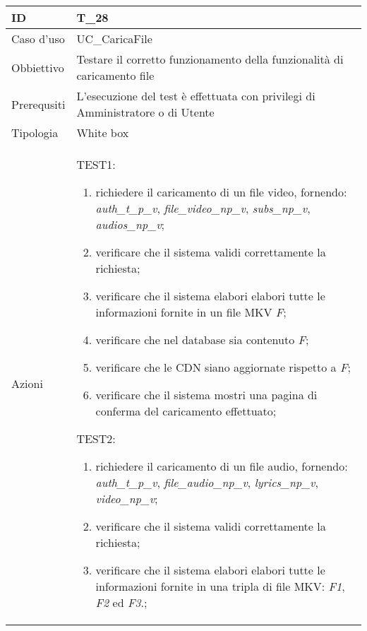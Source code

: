 \begin{table}[hb]
    \centering
    \begin{tabular}{ |p{2cm}|p{10cm}|  }
        \hline
        ID          & T\_28                                                                          \\\hline
        Caso d'uso  & UC\_CaricaFile                                                                 \\\hline
        Obbiettivo  & Testare il corretto funzionamento della funzionalità di caricamento file       \\\hline
        Prerequsiti & L'esecuzione del test è effettuata con privilegi di Amministratore o di Utente \\\hline
        Tipologia   & White box                                                                      \\\hline
        Azioni      &
        TEST1:
        \begin{enumerate}[nosep, topsep=0pt]
            \item richiedere il caricamento di un file video, fornendo: \emph{auth\_t\_p\_v}, \emph{file\_video\_np\_v}, \emph{subs\_np\_v}, \emph{audios\_np\_v};
            \item verificare che il sistema validi correttamente la richiesta;
            \item verificare che il sistema elabori elabori tutte le informazioni fornite in un file MKV \emph{F};
            \item verificare che nel database sia contenuto \emph{F};
            \item verificare che le CDN siano aggiornate rispetto a \emph{F};
            \item verificare che il sistema mostri una pagina di conferma del caricamento effettuato;
        \end{enumerate}
        \vspace{0.5cm} TEST2:
        \begin{enumerate}[nosep, topsep=0pt]
            \item richiedere il caricamento di un file audio, fornendo: \emph{auth\_t\_p\_v}, \emph{file\_audio\_np\_v}, \emph{lyrics\_np\_v}, \emph{video\_np\_v};
            \item verificare che il sistema validi correttamente la richiesta;
            \item verificare che il sistema elabori elabori tutte le informazioni fornite in una tripla di file MKV: \emph{F1}, \emph{F2} ed \emph{F3}.;

\end{enumerate}
\end{tabular}
\end{table}
